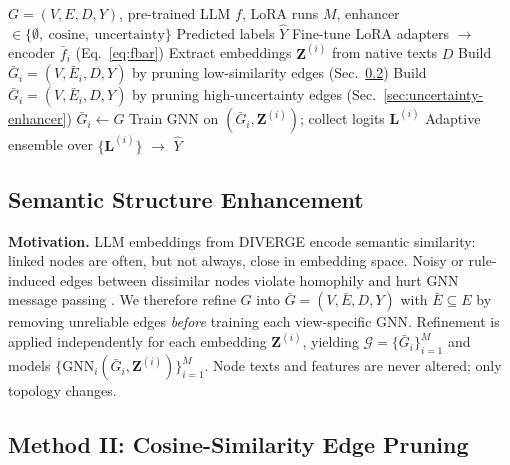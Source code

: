 \documentclass{article}
\begin{document}
\begin{algorithm}[t]
\caption{DIVERGE base pipeline (unchanged text; optional structure refinement)}
\label{alg:diverge-short}
\begin{algorithmic}
\REQUIRE $G=(V,E,D,Y)$, pre-trained LLM $f$, LoRA runs $M$, enhancer $\in\{\emptyset,\ \text{cosine},\ \text{uncertainty}\}$
\ENSURE Predicted labels $\hat{Y}$
    \STATE Fine-tune LoRA adapters $\rightarrow$ encoder $\bar{f}_i$ (Eq.~\ref{eq:fbar})
    \STATE Extract embeddings $\mathbf{Z}^{(i)}$ from native texts $D$
        \STATE Build $\bar{G}_i=(V,\bar{E}_i,D,Y)$ by pruning low-similarity edges (Sec.~\ref{sec:cosine-enhancer})
        \STATE Build $\bar{G}_i=(V,\bar{E}_i,D,Y)$ by pruning high-uncertainty edges (Sec.~\ref{sec:uncertainty-enhancer})
    \ELSE
        \STATE $\bar{G}_i \leftarrow G$
    \ENDIF
    \STATE Train GNN on $(\bar{G}_i,\mathbf{Z}^{(i)})$; collect logits $\mathbf{L}^{(i)}$
\ENDFOR
\STATE Adaptive ensemble over $\{\mathbf{L}^{(i)}\}$ $\rightarrow$ $\hat{Y}$
\end{algorithmic}
\end{algorithm}


\subsection{Semantic Structure Enhancement}
\label{sec:structure-enhancer}

\textbf{Motivation.} LLM embeddings from DIVERGE encode semantic similarity: linked
nodes are often, but not always, close in embedding space. Noisy or rule-induced
edges between dissimilar nodes violate homophily and hurt GNN message passing
\citep{jin2020prognn,chen2020idgl}. We therefore refine $G$ into
$\bar{G}=(V,\bar{E},D,Y)$ with $\bar{E}\subseteq E$ by removing unreliable edges
\emph{before} training each view-specific GNN. Refinement is applied independently
for each embedding $\mathbf{Z}^{(i)}$, yielding
$\mathcal{G}=\{\bar{G}_i\}_{i=1}^{M}$ and models
$\{\mathrm{GNN}_i(\bar{G}_i,\mathbf{Z}^{(i)})\}_{i=1}^{M}$.
Node texts and features are never altered; only topology changes.


\subsection{Method II: Cosine-Similarity Edge Pruning}
\label{sec:cosine-enhancer}
\end{document}

